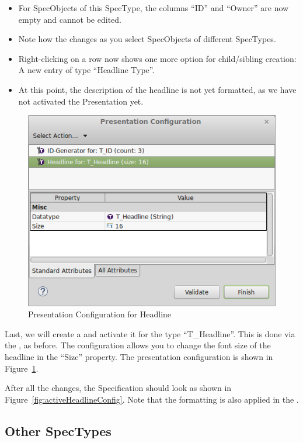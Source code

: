 \begin{itemize}
\item
  For SpecObjects of this SpecType, the columns ``ID'' and ``Owner'' are now empty and cannot be edited.
\item
  Note how the  changes as you select SpecObjects of different SpecTypes.
\item
  Right-clicking on a row now shows one more option for child/sibling creation: A new entry of type ``Headline Type''.
\item At this point, the description of the headline is not yet formatted, as we have not activated the Presentation yet.
\end{itemize}

\begin{figure}
\centering      
\includegraphics[width=0.8\linewidth]{../rmf-images/Presentation_headline.png}      
\caption{Presentation Configuration for Headline}      
\label{fig:headlineConfig2}
\end{figure}

Last, we will create a  and activate it for the type ``T\_Headline''.  This is done via the , as before.  The configuration allows you to change the font size of the headline in the ``Size'' property.  The presentation configuration is shown in Figure~\ref{fig:headlineConfig2}.

After all the changes, the Specification should look as shown in Figure~\ref{fig:activeHeadlineConfig}.  Note that the formatting is also applied in the .

\subsection{Other SpecTypes}
\label{sec:other-spec-types}

